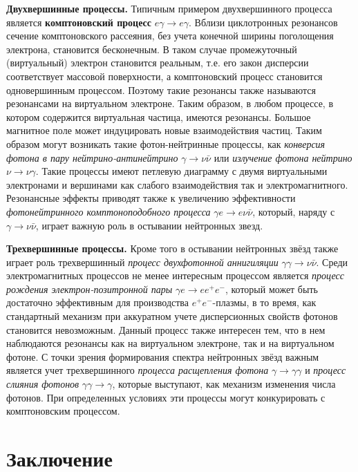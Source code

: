 \documentclass[12pt]{article}
\begin{document}
{\bf Двухвершинные процессы.} Типичным примером двухвершинного процесса является {\bfseries комптоновский процесс}  $e \gamma \to e\gamma$. Вблизи циклотронных резонансов сечение комптоновского рассеяния, без учета 
конечной ширины поголощения электрона, становится бесконечным. В таком случае промежуточный (виртуальный) электрон становится реальным, т.е. его закон дисперсии соответствует массовой поверхности, 
а комптоновский процесс становится одновершинным процессом. Поэтому такие резонансы также называются резонансами на виртуальном электроне. Таким образом, в любом процессе, в котором содержится виртуальная частица, 
имеются резонансы. Большое магнитное поле может индуцировать новые взаимодействия частиц. Таким образом могут возникать такие фотон-нейтринные процессы, как \textit{конверсия фотона в пару нейтрино-антинейтрино} 
$\gamma \to \nu \bar{\nu}$ или \textit{излучение фотона нейтрино} $\nu \to \nu \gamma$. Такие процессы имеют петлевую диаграмму с двумя виртуальными электронами и вершинами как слабого взаимодействия так и электромагнитного. 
Резонансные эффекты приводят также к увеличению эффективности \textit{фотонейтринного комптоноподобного процесса} $\gamma e \to e\nu \bar{\nu}$, который, наряду с $\gamma \to \nu \bar{\nu}$, играет важную роль
 в остывании нейтронных звезд.
		
{\bf Трехвершинные процессы.} Кроме того в остывании нейтронных звёзд также играет роль трехвершинный	
\textit{процесс двухфотонной аннигиляции} $\gamma\gamma\to\nu \bar{\nu}$. Среди электромагнитных процессов не менее интересным процессом является 
\textit{процесс рождения электрон-позитронной пары} $\gamma e \to e e^+e^-$, который может быть достаточно эффективным для производства $e^+e^-$-плазмы, в то время, как стандартный механизм 
при аккуратном учете дисперсионных свойств фотонов становится невозможным. Данный процесс также интересен тем, что в нем наблюдаются резонансы как на виртуальном электроне, так и на виртуальном фотоне. 
С точки зрения формирования спектра нейтронных звёзд важным является учет трехвершинного \textit{процесса расщепления фотона} $\gamma \to \gamma \gamma$ и \textit{процесс слияния фотонов} 
$\gamma \gamma \to \gamma$, которые выступают, как механизм изменения числа фотонов. При определенных условиях эти процессы могут конкурировать с комптоновским процессом.  \\
	
\section{Заключение}
\newpage


\end{document}
